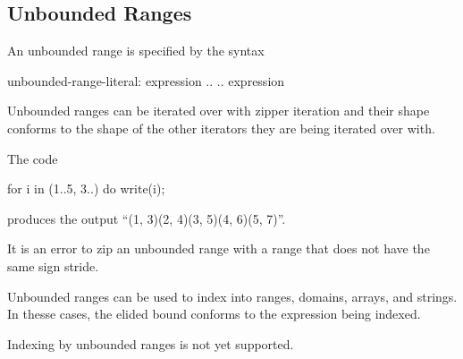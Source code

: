 \subsection{Unbounded Ranges}
\label{Unbounded_Ranges}

An unbounded range is specified by the syntax
\begin{syntax}
unbounded-range-literal:
  expression ..
  .. expression
\end{syntax}

Unbounded ranges can be iterated over with zipper iteration and their
shape conforms to the shape of the other iterators they are being
iterated over with.
\begin{example}
The code
\begin{chapel}
for i in (1..5, 3..) do
  write(i);
\end{chapel}
produces the output ``(1, 3)(2, 4)(3, 5)(4, 6)(5, 7)''.
\end{example}

It is an error to zip an unbounded range with a range that does not
have the same sign stride.

Unbounded ranges can be used to index into ranges, domains, arrays,
and strings.  In thesse cases, the elided bound conforms to the
expression being indexed.
\begin{status}
Indexing by unbounded ranges is not yet supported.
\end{status}
